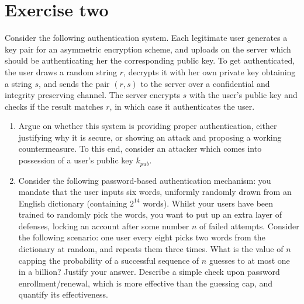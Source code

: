 \section{Exercise two}

Consider the following authentication system. 
Each legitimate user generates a key pair for an asymmetric encryption scheme, and uploads on the server which should be authenticating her the corresponding public key. 
To get authenticated, the user draws a random string $r$, decrypts it with her own private key obtaining a string $s$, and sends the pair $(r,s)$ to the server over a confidential and integrity preserving channel. 
The server encrypts $s$ with the user's public key and checks if the result matches $r$, in which case it authenticates the user.
\begin{enumerate}
    \item Argue on whether this system is providing proper authentication, either justifying why it is secure, or showing an attack and proposing a working countermeasure. 
        To this end, consider an attacker which comes into possession of a user's public key $k_{pub}$.
    \item Consider the following password-based authentication mechanism: you mandate that the user inputs six words, uniformly randomly drawn from an English dictionary (containing $2^{14}$ words).
        Whilst your users have been trained to randomly pick the words, you want to put up an extra layer of defenses, locking an account after some number $n$ of failed attempts.
        Consider the following scenario: one user every eight picks two words from the dictionary at random, and repeats them three times.
        What is the value of $n$ capping the probability of a successful sequence of $n$ guesses to at most one in a billion? 
        Justify your answer.
        Describe a simple check upon password enrollment/renewal, which is more effective than the guessing cap, and quantify its effectiveness.
\end{enumerate}


